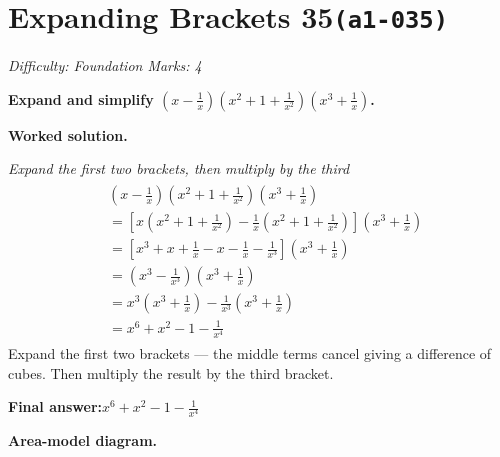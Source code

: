 \documentclass[11pt]{article}
\newcommand{\question}[1]{\par\medskip\noindent\textbf{#1}\par}
\begin{document}
\section*{Expanding Brackets 35\quad\small\texttt{(a1-035)}}
\textit{Difficulty: Foundation \quad\textbar\quad Marks: 4}

\question{Expand and simplify \( \left( x - \frac{1}{x} \right)\left( x^2 + 1 + \frac{1}{x^2} \right)\left( x^3 + \frac{1}{x} \right) \).}

\textbf{Worked solution.}

\textit{Expand the first two brackets, then multiply by the third}
\[\begin{gathered}
\begin{aligned} &\left( x - \frac{1}{x} \right)\left( x^2 + 1 + \frac{1}{x^2} \right)\left( x^3 + \frac{1}{x} \right) \\ &= \left[ x\left( x^2+1+\frac{1}{x^2} \right) -\frac{1}{x}\left( x^2+1+\frac{1}{x^2} \right) \right]\left( x^3 + \frac{1}{x} \right) \\ &= \left[ x^3 + x + \frac{1}{x} - x - \frac{1}{x} - \frac{1}{x^3} \right]\left( x^3 + \frac{1}{x} \right) \\ &= \left( x^3 - \frac{1}{x^3} \right)\left( x^3 + \frac{1}{x} \right) \\ &= x^3\left( x^3 + \frac{1}{x}\right) -\frac{1}{x^3}\left( x^3 + \frac{1}{x} \right) \\ &= x^6 + x^2 - 1 - \frac{1}{x^4} \end{aligned}
\end{gathered}\]
Expand the first two brackets — the middle terms cancel giving a difference of cubes. Then multiply the result by the third bracket.

\begin{answerbox}
\textbf{Final answer:}\quad \(\displaystyle x^6 + x^2 - 1 - \frac{1}{x^4}\)
\end{answerbox}
\textbf{Area-model diagram.}
\end{document}
